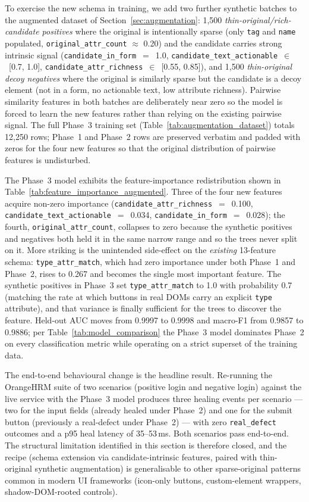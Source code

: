 \documentclass[conference]{IEEEtran}
\begin{document}
To exercise the new schema in training, we add two further synthetic batches to the augmented dataset of Section~\ref{sec:augmentation}: 1{,}500 \emph{thin-original/rich-candidate positives} where the original is intentionally sparse (only \texttt{tag} and \texttt{name} populated, \texttt{original\_attr\_count} $\approx$ 0.20) and the candidate carries strong intrinsic signal (\texttt{candidate\_in\_form}~$=$~1.0, \texttt{candidate\_text\_actionable}~$\in$~[0.7, 1.0], \texttt{candidate\_attr\_richness}~$\in$~[0.55, 0.85]), and 1{,}500 \emph{thin-original decoy negatives} where the original is similarly sparse but the candidate is a decoy element (not in a form, no actionable text, low attribute richness). Pairwise similarity features in both batches are deliberately near zero so the model is forced to learn the new features rather than relying on the existing pairwise signal. The full Phase~3 training set (Table~\ref{tab:augmentation_dataset}) totals 12{,}250 rows; Phase~1 and Phase~2 rows are preserved verbatim and padded with zeros for the four new features so that the original distribution of pairwise features is undisturbed.

The Phase~3 model exhibits the feature-importance redistribution shown in Table~\ref{tab:feature_importance_augmented}. Three of the four new features acquire non-zero importance (\texttt{candidate\_attr\_richness}~$=$~0.100, \texttt{candidate\_text\_actionable}~$=$~0.034, \texttt{candidate\_in\_form}~$=$~0.028); the fourth, \texttt{original\_attr\_count}, collapses to zero because the synthetic positives and negatives both held it in the same narrow range and so the trees never split on it. More striking is the unintended side-effect on the \emph{existing} 13-feature schema: \texttt{type\_attr\_match}, which had zero importance under both Phase~1 and Phase~2, rises to 0.267 and becomes the single most important feature. The synthetic positives in Phase~3 set \texttt{type\_attr\_match} to 1.0 with probability 0.7 (matching the rate at which buttons in real DOMs carry an explicit \texttt{type} attribute), and that variance is finally sufficient for the trees to discover the feature. Held-out AUC moves from 0.9997 to 0.9998 and macro-F1 from 0.9857 to 0.9886; per Table~\ref{tab:model_comparison} the Phase~3 model dominates Phase~2 on every classification metric while operating on a strict superset of the training data.

The end-to-end behavioural change is the headline result. Re-running the OrangeHRM suite of two scenarios (positive login and negative login) against the live service with the Phase~3 model produces three healing events per scenario --- two for the input fields (already healed under Phase~2) and one for the submit button (previously a real-defect under Phase~2) --- with zero \texttt{real\_defect} outcomes and a p95 heal latency of 35--53\,ms. Both scenarios pass end-to-end. The structural limitation identified in this section is therefore closed, and the recipe (schema extension via candidate-intrinsic features, paired with thin-original synthetic augmentation) is generalisable to other sparse-original patterns common in modern UI frameworks (icon-only buttons, custom-element wrappers, shadow-DOM-rooted controls).
\end{document}
